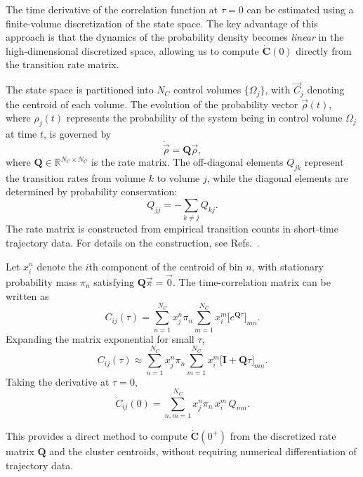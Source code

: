 \documentclass[%
  prl,
  reprint,
  amsmath,
  amssymb,
  aps
]{revtex4-2}
\newcommand{\vvec}[1]{\vec{#1}}
\begin{document}
The time derivative of the correlation function at $\tau=0$ can be estimated using a finite-volume discretization of the state space. The key advantage of this approach is that the dynamics of the probability density becomes \emph{linear} in the high-dimensional discretized space, allowing us to compute $\dot{\bm{C}}(0)$ directly from the transition rate matrix.

The state space is partitioned into $N_C$ control volumes $\{\Omega_j\}$, with $\vvec{C}_j$ denoting the centroid of each volume. The evolution of the probability vector $\vvec{\rho}(t)$, where $\rho_j(t)$ represents the probability of the system being in control volume $\Omega_j$ at time $t$, is governed by
\begin{equation}
\dot{\vvec{\rho}} = \bm{Q}\vvec{\rho},
\end{equation}
where $\bm{Q} \in \mathbb{R}^{N_C \times N_C}$ is the rate matrix. The off-diagonal elements $Q_{jk}$ represent the transition rates from volume $k$ to volume $j$, while the diagonal elements are determined by probability conservation:
\begin{equation}
Q_{jj} = -\sum_{k \neq j} Q_{kj}.
\end{equation}
The rate matrix is constructed from empirical transition counts in short-time trajectory data. For details on the construction, see Refs.~\cite{giorgini2024reduced,souza2024representing_a}.

Let $x_i^n$ denote the $i$th component of the centroid of bin $n$, with stationary probability mass $\pi_n$ satisfying $\bm{Q}\vvec{\pi} = \vvec{0}$. The time-correlation matrix can be written as
\begin{equation}
C_{ij}(\tau) = \sum_{n=1}^{N_C} x_j^n \pi_n \sum_{m=1}^{N_C} x_i^m \bigl[e^{\bm{Q}\tau}\bigr]_{mn}.
\end{equation}
Expanding the matrix exponential for small $\tau$,
\begin{equation}
C_{ij}(\tau) \approx \sum_{n=1}^{N_C} x_j^n \pi_n \sum_{m=1}^{N_C} x_i^m \bigl[\bm{I} + \bm{Q}\tau\bigr]_{mn}.
\end{equation}
Taking the derivative at $\tau=0$,
\begin{equation}
\dot{C}_{ij}(0) = \sum_{n,m=1}^{N_C} x_j^n \pi_n \, x_i^m \, Q_{mn}.
\end{equation}

This provides a direct method to compute $\dot{\bm{C}}(0^+)$ from the discretized rate matrix $\bm{Q}$ and the cluster centroids, without requiring numerical differentiation of trajectory data.
\end{document}
